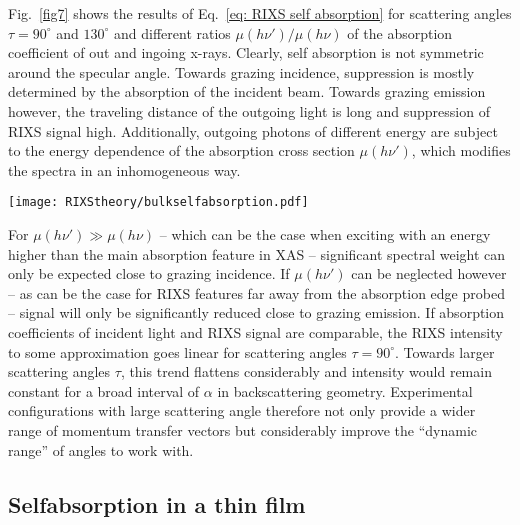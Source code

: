 \documentclass[twocolumn,prb,twocolumn,amsmath,superscriptaddress,nofootinbib,amssymb]{revtex4-1}
\begin{document}
\begin{widetext}
Fig.~\ref{fig7} shows the results of Eq.~\ref{eq: RIXS self absorption} for scattering angles $\tau=90^{\circ}$ and $130^{\circ}$ and different ratios $\mu(h\nu')/\mu(h\nu)$ of the absorption coefficient of out and ingoing x-rays.
Clearly, self absorption is not symmetric around the specular angle. Towards grazing incidence, suppression is mostly determined by the absorption of the incident beam. Towards grazing emission however, the traveling distance of the outgoing light is long and suppression of RIXS signal high. Additionally, outgoing photons of different energy are subject to the energy dependence of the absorption cross section $\mu(h\nu')$, which modifies the spectra in an inhomogeneous way.

\begin{figure*}[htbp]
\begin{center}
\texttt{[image: RIXStheory/bulkselfabsorption.pdf]}
\caption{\label{fig7} Self absorption in bulk samples. Results are shown for two experimental geometries with \textbf{(left)} $\tau=90^{\circ}$ and \textbf{(right)} $\tau=130^{\circ}$ scattering angle in units of the total RIXS signal created in the solid. The characteristic parameter $\mu(h\nu')/\mu(h\nu)$ is varied over 4 orders of magnitude.}
\end{center}
\end{figure*}

For $\mu(h\nu')\gg \mu(h\nu)$ -- which can be the case when exciting with an energy higher than the main absorption feature in XAS -- significant spectral weight can only be expected close to grazing incidence. If $\mu(h\nu')$ can be neglected however -- as can be the case for RIXS features far away from the absorption edge probed -- signal will only be significantly reduced close to grazing emission. If absorption coefficients of incident light and RIXS signal are comparable, the RIXS intensity to some approximation goes linear for scattering angles $\tau=90^{\circ}$. Towards larger scattering angles $\tau$, this trend flattens considerably and intensity would remain constant for a broad interval of $\alpha$ in backscattering geometry. Experimental configurations with large scattering angle therefore not only provide a wider range of momentum transfer vectors but considerably improve the ``dynamic range'' of angles to work with.



\subsection{Selfabsorption in a thin film}


\end{widetext}
\end{document}
